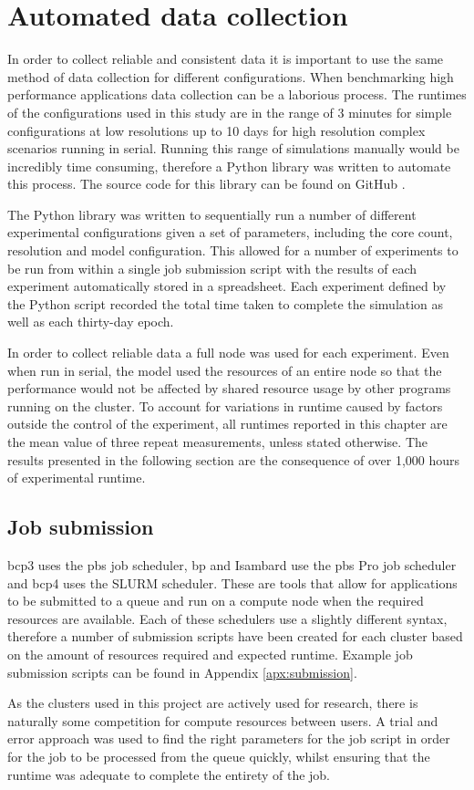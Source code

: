 \documentclass[a4paper,11pt]{report}
\begin{document}
\section{Automated data collection}
In order to collect reliable and consistent data it is important to use the same method of data collection for different configurations. When benchmarking high performance applications data collection can be a laborious process. The runtimes of the configurations used in this study are in the range of 3 minutes for simple configurations at low resolutions up to 10 days for high resolution complex scenarios running in serial. Running this range of simulations manually would be incredibly time consuming, therefore a Python library was written to automate this process. The source code for this library can be found on GitHub \cite{lancaster2019github}. 
\par
The Python library was written to sequentially run a number of different experimental configurations given a set of parameters, including the core count, resolution and model configuration. This allowed for a number of experiments to be run from within a single job submission script with the results of each experiment automatically stored in a spreadsheet. Each experiment defined by the Python script recorded the total time taken to complete the simulation as well as each thirty-day epoch.
\par
In order to collect reliable data a full node was used for each experiment. Even when run in serial, the model used the resources of an entire node so that the performance would not be affected by shared resource usage by other programs running on the cluster. To account for variations in runtime caused by factors outside the control of the experiment, all runtimes reported in this chapter are the mean value of three repeat measurements, unless stated otherwise. The results presented in the following section are the consequence of over 1,000 hours of experimental runtime. 


\subsection{Job submission}
\gls{bcp3} uses the \gls{pbs} job scheduler, \gls{bp} and Isambard use the \gls{pbs} Pro job scheduler and \gls{bcp4} uses the SLURM scheduler. These are tools that allow for applications to be submitted to a queue and run on a compute node when the required resources are available. Each of these schedulers use a slightly different syntax, therefore a number of submission scripts have been created for each cluster based on the amount of resources required and expected runtime. Example job submission scripts can be found in Appendix \ref{apx:submission}. 
\par
As the clusters used in this project are actively used for research, there is naturally some competition for compute resources between users. A trial and error approach was used to find the right parameters for the job script in order for the job to be processed from the queue quickly, whilst ensuring that the runtime was adequate to complete the entirety of the job.
\end{document}
